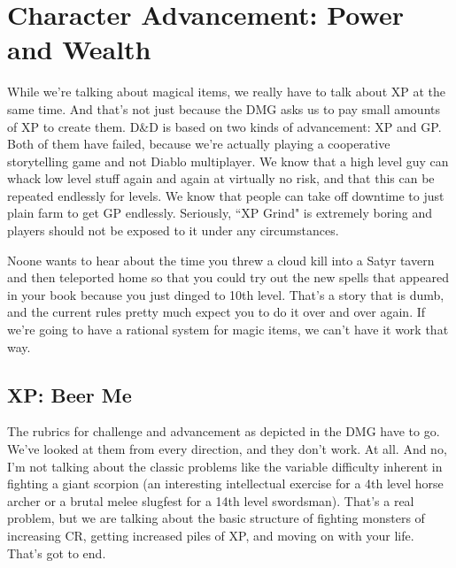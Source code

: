 \section{Character Advancement: Power and Wealth}
\vspace*{-8pt}

While we're talking about magical items, we really have to talk about XP at the same time. And that's not just because the DMG asks us to pay small amounts of XP to create them. D\&D is based on two kinds of advancement: XP and GP. Both of them have failed, because we're actually playing a cooperative storytelling game and not Diablo multiplayer. We know that a high level guy can whack low level stuff again and again at virtually no risk, and that this can be repeated endlessly for levels. We know that people can take off downtime to just plain farm to get GP endlessly. Seriously, ``XP Grind" is extremely boring and players should not be exposed to it under any circumstances.

Noone wants to hear about the time you threw a cloud kill into a Satyr tavern and then teleported home so that you could try out the new spells that appeared in your book because you just dinged to 10th level. That's a story that is dumb, and the current rules pretty much expect you to do it over and over again. If we're going to have a rational system for magic items, we can't have it work that way.

\subsection{XP: Beer Me}
\vspace*{-8pt}

The rubrics for challenge and advancement as depicted in the DMG have to go. We've looked at them from every direction, and they don't work. At all. And no, I'm not talking about the classic problems like the variable difficulty inherent in fighting a giant scorpion (an interesting intellectual exercise for a 4th level horse archer or a brutal melee slugfest for a 14th level swordsman). That's a real problem, but we are talking about the basic structure of fighting monsters of increasing CR, getting increased piles of XP, and moving on with your life. That's got to end.

